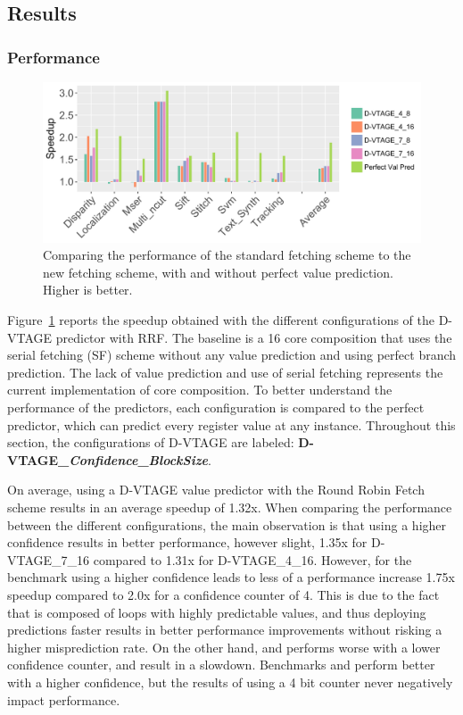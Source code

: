 \subsection{Results}

\subsubsection{Performance}

\begin{figure}[t]
    \centering
    \includegraphics[width=1\textwidth]{chapter3/graphics/vtage_speed2.pdf}
    \caption{Comparing the performance of the standard fetching scheme to the new fetching scheme, with and without perfect value prediction. Higher is better.}
    \label{fig:vtage_perf}
	\vspace{1em}
\end{figure}

Figure~\ref{fig:vtage_perf} reports the speedup obtained with the different configurations of the D-VTAGE predictor with RRF.
The baseline is a 16 core composition that uses the serial fetching (SF) scheme without any value prediction and using perfect branch prediction.
The lack of value prediction and use of serial fetching represents the current implementation of core composition.
To better understand the performance of the predictors, each configuration is compared to the perfect predictor, which can predict every register value at any instance.
Throughout this section, the configurations of D-VTAGE are labeled: \textbf{D-VTAGE\_\textit{Confidence}\_\textit{BlockSize}}.

On average, using a D-VTAGE value predictor with the Round Robin Fetch scheme results in an average speedup of 1.32x.
When comparing the performance between the different configurations, the main observation is that using a higher confidence results in better performance, however slight, 1.35x for D-VTAGE\_7\_16 compared to 1.31x for D-VTAGE\_4\_16.
However, for the benchmark  using a higher confidence leads to less of a performance increase 1.75x speedup compared to 2.0x for a confidence counter of 4.
This is due to the fact that  is composed of loops with highly predictable values, and thus deploying predictions faster results in better performance improvements without risking a higher misprediction rate.
On the other hand,  and  performs worse with a lower confidence counter, and result in a slowdown.
Benchmarks  and  perform better with a higher confidence, but the results of using a 4 bit counter never negatively impact performance.

